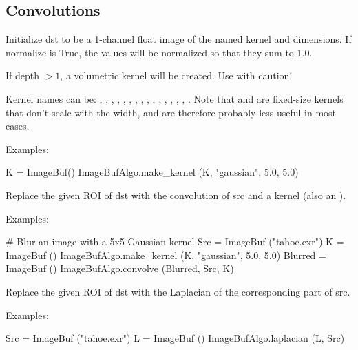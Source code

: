 \subsection{Convolutions}
\label{sec:iba:py:convolutions}

 
Initialize {\cf dst} to be a 1-channel {\cf float} image of the named kernel
and dimensions.  If {\cf normalize} is {\cf True}, the values will be
normalized so that they sum to $1.0$.

If {\cf depth} $> 1$, a volumetric kernel will be created.  Use with
caution!

Kernel names can be: , , ,
, , , ,
, , , , ,
, , , . Note that
 and  are fixed-size kernels that don't
scale with the width, and are therefore probably less useful in most
cases.

\smallskip
\noindent Examples:
\begin{code}
    K = ImageBuf()
    ImageBufAlgo.make_kernel (K, "gaussian", 5.0, 5.0)
\end{code}
\apiend


 
Replace the given ROI of {\cf dst} with the convolution of {\cf src} and
a kernel (also an \ImageBuf).

\smallskip
\noindent Examples:
\begin{code}
    # Blur an image with a 5x5 Gaussian kernel
    Src = ImageBuf ("tahoe.exr")
    K = ImageBuf ()
    ImageBufAlgo.make_kernel (K, "gaussian", 5.0, 5.0)
    Blurred = ImageBuf ()
    ImageBufAlgo.convolve (Blurred, Src, K)
\end{code}
\apiend


 
Replace the given ROI of {\cf dst} with the Laplacian of the corresponding
part of {\cf src}.

\smallskip
\noindent Examples:
\begin{code}
    Src = ImageBuf ("tahoe.exr")
    L = ImageBuf ()
    ImageBufAlgo.laplacian (L, Src)
\end{code}
\apiend


